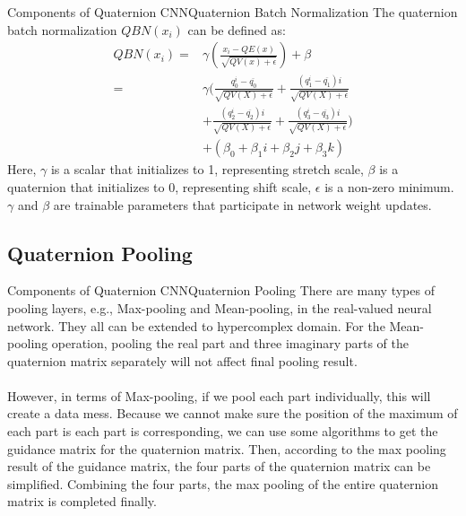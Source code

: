 \documentclass{beamer}
\begin{document}
\begin{frame}{Components of Quaternion CNN}{Quaternion Batch Normalization}
The quaternion batch normalization $QBN(x_i)$ can be defined as:
\begin{equation}
    \begin{split}
        QBN(x_i)=&\gamma(\frac{x_i-QE(x)}{\sqrt{QV(x)+\epsilon}})+\beta\\
            =&\gamma(\frac{q_0^i-\overline{q_0}}{\sqrt{QV(X)+\epsilon}}+\frac{(q_1^i-\overline{q_1})i}{\sqrt{QV(X)+\epsilon}}\\
                &+\frac{(q_2^i-\overline{q_2})i}{\sqrt{QV(X)+\epsilon}}+\frac{(q_3^i-\overline{q_3})i}{\sqrt{QV(X)+\epsilon}})\\
                &+(\beta_0+\beta_1i+\beta_2j+\beta_3k)
    \end{split}
\end{equation}
Here, $\gamma$ is a scalar that initializes to 1, representing stretch
scale, $\beta$ is a quaternion that initializes to 0, representing
shift scale, $\epsilon$ is a non-zero minimum. $\gamma$ and $\beta$ are trainable parameters that participate in network weight updates.
\end{frame}

\subsection{Quaternion Pooling}
\begin{frame}{Components of Quaternion CNN}{Quaternion Pooling}
There are many types of pooling layers, e.g., Max-pooling and Mean-pooling, in the real-valued neural network. They all can be extended to hypercomplex domain. For the Mean-pooling operation, pooling the real part and three imaginary parts of the quaternion matrix separately will not affect final pooling result. 
\\~\\
However, in terms of Max-pooling, if we pool
each part individually, this will create a data mess. Because
we cannot make sure the position of the maximum of each
part is each part is corresponding, we can use some algorithms
to get the guidance matrix for the quaternion matrix. Then,
according to the max pooling result of the guidance matrix,
the four parts of the quaternion matrix can be simplified.
Combining the four parts, the max pooling of the entire quaternion matrix is completed finally. 
\end{frame}
\end{document}

